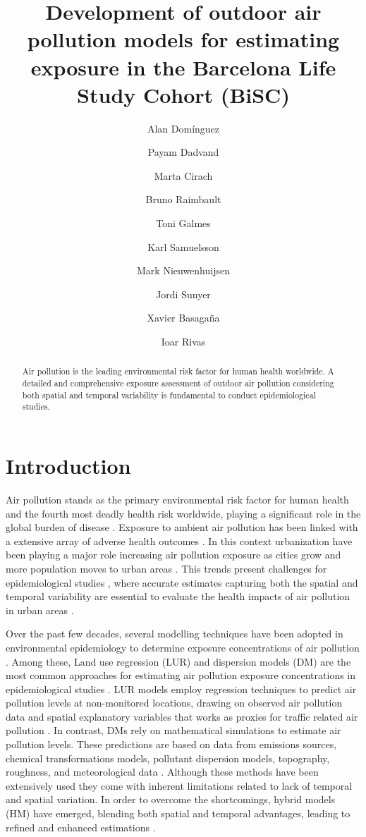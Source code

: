 \documentclass{article}
\title{Development of outdoor air pollution models for estimating exposure in the Barcelona Life Study Cohort (BiSC)}
\author[1, 2]{Alan Domínguez}
\author[1, 3, 4]{Payam Dadvand}
\author[1]{Marta Cirach}
\author[1]{Bruno Raimbault}
\author[1]{Toni Galmes}
\author[1]{Karl Samuelsson}
\author[1, 2, 3]{Mark Nieuwenhuijsen}
\author[1, 2, 3]{Jordi Sunyer}
\author[1, 2, 3]{Xavier Basagaña}
\author[1, 3]{Ioar Rivas}
\affil[1]{Barcelona Institute for Global Health (ISGlobal), Barcelona, Spain.}
\affil[2]{Universitat Popmpeu Fabra (UPF), Barcelona, Spain.}
\affil[3]{CIBER Epidemiología y Salud Pública (CIBERESP), Madrid, Spain.}
\affil[4]{London School of Hygiene and Tropical Medicine (LSHTM), London, UK.}
\begin{document}
\maketitle

\begin{abstract}

Air pollution is the leading environmental risk factor for human health worldwide. A detailed and comprehensive exposure assessment of outdoor air pollution considering both spatial and temporal variability is fundamental to conduct epidemiological studies.  

\end{abstract}

\section{Introduction}

Air pollution stands as the primary environmental risk factor for human health and the fourth most deadly health risk worldwide, playing a significant role in the global burden of disease \cite{cohen2017, he2020state}. Exposure to ambient air pollution has been linked with a extensive array of adverse health outcomes \cite{boogaard2022, guxens2022hei, haddad2023}. In this context urbanization have been playing a major role increasing air pollution exposure as cities grow and more population moves to urban areas \cite{nieuwenhuijsen2016}. This trends present challenges for epidemiological studies \cite{tonne2017}, where accurate estimates capturing both the spatial and temporal variability are essential to evaluate the health impacts of air pollution in urban areas \cite{boogaard2022}. 

Over the past few decades, several modelling techniques have been adopted in environmental epidemiology to determine exposure concentrations of air pollution \cite{hoek2017, di2019no2, di2019pm25, stafoggia2019, stafoggia2020}. Among these, Land use regression (LUR) and dispersion models (DM) are the most common approaches for estimating air pollution exposure concentrations in epidemiological studies \cite{gulliver2015, dehoogh2014}. LUR models employ regression techniques to predict air pollution levels at non-monitored locations, drawing on observed air pollution data and spatial explanatory variables that works as proxies for traffic related air pollution \cite{briggs1997, hoek2008}. In contrast, DMs rely on mathematical simulations to estimate air pollution levels. These predictions are based on data from emissions sources, chemical transformations models, pollutant dispersion models, topography, roughness, and meteorological data \cite{hoek2017}. Although these methods have been extensively used they come with inherent limitations related to lack of temporal and spatial variation. In order to overcome the shortcomings, hybrid models (HM) have emerged, blending both spatial and temporal advantages, leading to refined and enhanced estimations \cite{hoek2017, korek2017, tularam2021, oh2021}. 
\end{document}
